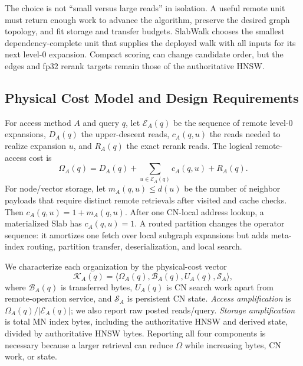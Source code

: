 \documentclass[sigconf,nonacm]{acmart}
\begin{document}
The choice is not ``small versus large reads'' in isolation.  A useful remote
unit must return enough work to advance the algorithm, preserve the desired
graph topology, and fit storage and transfer budgets.  SlabWalk chooses the
smallest dependency-complete unit that supplies the deployed walk with all inputs
for its next level-0 expansion.  Compact scoring can change candidate order,
but the edges and fp32 rerank targets remain those of the authoritative HNSW.

\subsection{Physical Cost Model and Design Requirements}
\label{sec:operation-model}

For access method $A$ and query $q$, let $\mathcal{E}_A(q)$ be the sequence of
remote level-0 expansions, $D_A(q)$ the upper-descent reads, $c_A(q,u)$ the
reads needed to realize expansion $u$, and $R_A(q)$ the exact rerank reads.  The
logical remote-access cost is
\begin{equation}
  \Omega_A(q)=D_A(q)+\sum_{u\in\mathcal{E}_A(q)}c_A(q,u)+R_A(q).
  \label{eq:logical-cost}
\end{equation}
For node/vector storage, let $m_A(q,u)\leq d(u)$ be the number of neighbor
payloads that require distinct remote retrievals after visited and cache checks.
Then $c_A(q,u)=1+m_A(q,u)$.  After one CN-local address lookup, a materialized
Slab has $c_A(q,u)=1$.  A routed partition changes the operator sequence: it
amortizes one fetch over local subgraph expansions but adds meta-index routing,
partition transfer, deserialization, and local search.

We characterize each organization by the physical-cost vector
\begin{equation}
  \mathcal{K}_A(q)=\langle\Omega_A(q),\mathcal{B}_A(q),U_A(q),\mathcal{S}_A\rangle,
  \label{eq:physical-cost-vector}
\end{equation}
where $\mathcal{B}_A(q)$ is transferred bytes, $U_A(q)$ is CN search work apart
from remote-operation service, and $\mathcal{S}_A$ is persistent CN state.
\emph{Access amplification} is $\Omega_A(q)/|\mathcal{E}_A(q)|$; we also report
raw posted reads/query.  \emph{Storage amplification} is total MN index bytes,
including the authoritative HNSW and derived state, divided by authoritative
HNSW bytes.  Reporting all four components is necessary because a larger
retrieval can reduce $\Omega$ while increasing bytes, CN work, or state.
\end{document}
